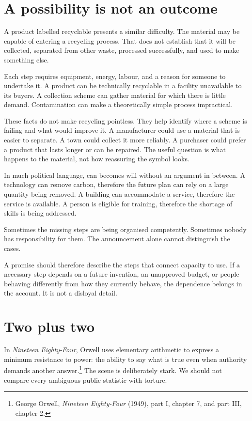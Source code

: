 \documentclass[12pt,a4paper]{book}
\begin{document}
\section*{A possibility is not an outcome}

A product labelled recyclable presents a similar difficulty. The material may be capable of entering a recycling process. That does not establish that it will be collected, separated from other waste, processed successfully, and used to make something else.

Each step requires equipment, energy, labour, and a reason for someone to undertake it. A product can be technically recyclable in a facility unavailable to its buyers. A collection scheme can gather material for which there is little demand. Contamination can make a theoretically simple process impractical.

These facts do not make recycling pointless. They help identify where a scheme is failing and what would improve it. A manufacturer could use a material that is easier to separate. A town could collect it more reliably. A purchaser could prefer a product that lasts longer or can be repaired. The useful question is what happens to the material, not how reassuring the symbol looks.

In much political language, can becomes will without an argument in between. A technology can remove carbon, therefore the future plan can rely on a large quantity being removed. A building can accommodate a service, therefore the service is available. A person is eligible for training, therefore the shortage of skills is being addressed.

Sometimes the missing steps are being organised competently. Sometimes nobody has responsibility for them. The announcement alone cannot distinguish the cases.

A promise should therefore describe the steps that connect capacity to use. If a necessary step depends on a future invention, an unapproved budget, or people behaving differently from how they currently behave, the dependence belongs in the account. It is not a disloyal detail.

\section*{Two plus two}

In \emph{Nineteen Eighty-Four}, Orwell uses elementary arithmetic to express a minimum resistance to power: the ability to say what is true even when authority demands another answer.\footnote{George Orwell, \emph{Nineteen Eighty-Four} (1949), part I, chapter 7, and part III, chapter 2.} The scene is deliberately stark. We should not compare every ambiguous public statistic with torture.
\end{document}
